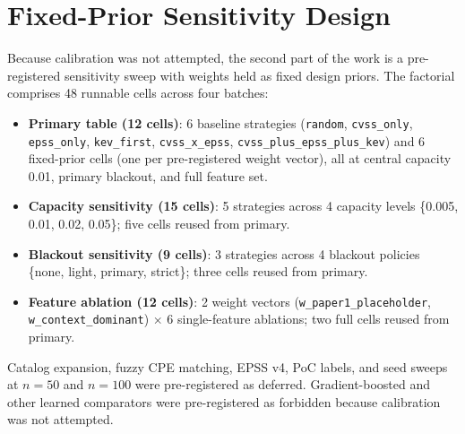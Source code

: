 \section{Fixed-Prior Sensitivity Design}
Because calibration was not attempted, the second part of the work is a pre-registered sensitivity sweep with weights held as fixed design priors. The factorial comprises 48 runnable cells across four batches:

\begin{itemize}
 \item \textbf{Primary table (12 cells)}: 6 baseline strategies (\texttt{random}, \texttt{cvss\_only}, \texttt{epss\_only}, \texttt{kev\_first}, \texttt{cvss\_x\_epss}, \texttt{cvss\_plus\_epss\_plus\_kev}) and 6 fixed-prior cells (one per pre-registered weight vector), all at central capacity 0.01, primary blackout, and full feature set.
 \item \textbf{Capacity sensitivity (15 cells)}: 5 strategies across 4 capacity levels \{0.005, 0.01, 0.02, 0.05\}; five cells reused from primary.
 \item \textbf{Blackout sensitivity (9 cells)}: 3 strategies across 4 blackout policies \{none, light, primary, strict\}; three cells reused from primary.
 \item \textbf{Feature ablation (12 cells)}: 2 weight vectors (\texttt{w\_paper1\_placeholder}, \texttt{w\_context\_dominant}) $\times$ 6 single-feature ablations; two full cells reused from primary.
\end{itemize}

Catalog expansion, fuzzy CPE matching, EPSS v4, PoC labels, and seed sweeps at $n = 50$ and $n = 100$ were pre-registered as deferred. Gradient-boosted and other learned comparators were pre-registered as forbidden because calibration was not attempted.
